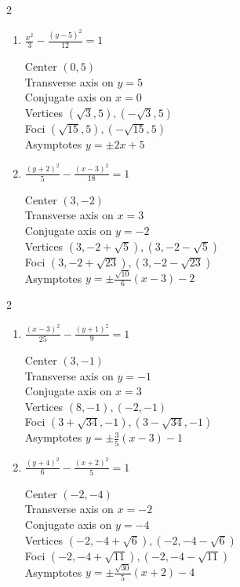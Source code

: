 \documentclass{ximera}
\begin{document}
\begin{multicols}{2}
\begin{enumerate}
\setcounter{enumi}{\value{HW}}


\item $\frac{x^{2}}{3} - \frac{(y - 5)^{2}}{12} = 1$

Center $(0, 5)$\\
Transverse axis on $y = 5$\\
Conjugate axis on $x = 0$\\
Vertices $(\sqrt{3}, 5), (-\sqrt{3}, 5)$\\
Foci $(\sqrt{15}, 5), (-\sqrt{15}, 5)$\\
Asymptotes $y = \pm 2x + 5$

\item $\frac{(y + 2)^{2}}{5} - \frac{(x - 3)^{2}}{18} = 1$

Center $(3, -2)$\\
Transverse axis on $x = 3$\\
Conjugate axis on $y = -2$\\
Vertices $(3, -2 + \sqrt{5}), (3, -2 - \sqrt{5})$\\
Foci $(3, -2 + \sqrt{23}), (3, -2 - \sqrt{23})$\\
Asymptotes $y = \pm \frac{\sqrt{10}}{6}(x - 3) - 2$


\setcounter{HW}{\value{enumi}}
\end{enumerate}
\end{multicols}


\begin{multicols}{2}
\begin{enumerate}
\setcounter{enumi}{\value{HW}}

\item $\frac{(x-3)^{2}}{25} - \frac{(y+1)^{2}}{9} = 1$

Center $(3, -1)$\\
Transverse axis on $y=-1$\\
Conjugate axis on $x=3$\\
Vertices $(8, -1), (-2, -1)$\\
Foci $\left(3+\sqrt{34}, -1 \right), \left(3-\sqrt{34}, -1 \right)$\\
Asymptotes $y = \pm \frac{3}{5}(x - 3) - 1$



\item $\frac{(y+4)^{2}}{6} - \frac{(x+2)^{2}}{5} = 1$

Center $(-2, -4)$\\
Transverse axis on $x=-2$\\
Conjugate axis on $y=-4$\\
Vertices $\left(-2,-4+\sqrt{6} \right), \left(-2,-4-\sqrt{6} \right)$\\
Foci $\left(-2, -4+\sqrt{11} \right), \left(-2, -4-\sqrt{11} \right)$\\
Asymptotes $y = \pm \frac{\sqrt{30}}{5}(x + 2) - 4$


\setcounter{HW}{\value{enumi}}
\end{enumerate}
\end{multicols}
\end{document}
